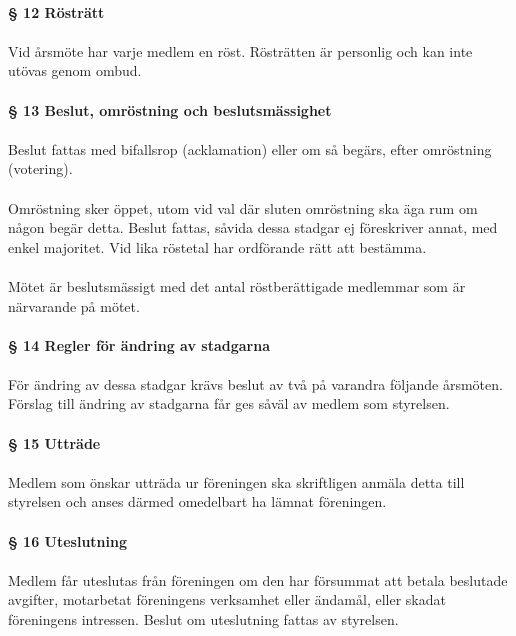 \documentclass[12pt, a4paper]{article}
\begin{document}
\paragraph{§ 12 Rösträtt}
\paragraph{}
Vid årsmöte har varje medlem en röst. Rösträtten är personlig och kan inte utövas genom ombud.

\paragraph{§ 13 Beslut, omröstning och beslutsmässighet}
\paragraph{}
Beslut fattas med bifallsrop (acklamation) eller om så begärs, efter omröstning (votering).

\paragraph{}
Omröstning sker öppet, utom vid val där sluten omröstning ska äga rum om någon begär detta. Beslut fattas, såvida dessa stadgar ej föreskriver
annat, med enkel majoritet. Vid lika röstetal har ordförande rätt att bestämma.

\paragraph{}
Mötet är beslutsmässigt med det antal röstberättigade medlemmar som är närvarande på mötet.

\paragraph{§ 14 Regler för ändring av stadgarna}
\paragraph{}
För ändring av dessa stadgar krävs beslut av två på varandra följande årsmöten. Förslag till ändring av stadgarna får ges såväl av medlem som styrelsen.

\paragraph{§ 15 Utträde}
\paragraph{}
Medlem som önskar utträda ur föreningen ska skriftligen anmäla detta till styrelsen och anses därmed omedelbart ha lämnat föreningen.

\paragraph{§ 16 Uteslutning}
\paragraph{}
Medlem får uteslutas från föreningen om den har försummat att betala beslutade avgifter, motarbetat föreningens
verksamhet eller ändamål, eller skadat föreningens intressen. Beslut om uteslutning fattas av styrelsen.
\end{document}
